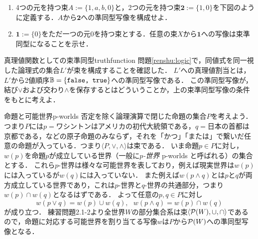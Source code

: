 \documentclass[11pt,a4paper, dvipdfmx]{jsarticle}
\begin{document}
\begin{renshu}{}{}
\begin{enumerate}
    \item 4つの元を持つ束$A := \{1, a, b, 0\}$と，2つの元を持つ束$\mathbf{2} := \{1, 0\}$を下図のように定義する．$A$から$\mathbf{2}$への準同型写像を構成せよ．\vspace{1em}
    \begin{center}
    \end{center}
    \item $\mathbf{1} := \{0\}$をただ一つの元$0$を持つ束とする．任意の束$X$から$\mathbf{1}$への写像は束準同型になることを示せ．
\end{enumerate}    
\end{renshu}    


\begin{rei}{真理値関数としての束準同型}{truthfunction}
問題\ref{renshu:logic}で，同値式を同一視した論理式の集合$L'$が束を構成することを確認した．
$L'$への真理値割当とは，$L'$から2値順序$\mathbb{B} = \{ \texttt{false, true} \}$への準同型写像である．
この準同型写像が，結び$\vee$および交わり$\wedge$を保存するとはどういうことか，上の束準同型写像の条件をもとに考えよ．
\end{rei}

\begin{rei}{命題と可能世界}{p-worlds}
否定を除く論理演算で閉じた命題の集合$P$を考えよう．
つまり$P$には$p=$ワシントンはアメリカの初代大統領である，$q=$日本の首都は京都である，などの原子命題のみならず，それを「かつ」「または」で繋いだ任意の命題が入っている．つまり$\langle P, \vee, \wedge \rangle$は束である．
いま命題$p \in P$に対し，$w(p)$を命題$p$が成立している世界（一般に\emph{$p$-世界} p-worlds と呼ばれる）の集合とする．
これら$p$-世界は様々な可能世界を表しており，例えば現実世界は$w(p)$には入っているが$w(q)$には入っていない．
また例えば$w(p \wedge q)$とは$p$と$q$が両方成立している世界であり，これは$p$-世界と$q$-世界の共通部分，つまり$w(p) \cap w(q)$となるはずである．
よって任意の$p, q \in P$に対し
\[ w(p \vee q) = w(p) \cup w(q), \ \ \ w(p \wedge q) = w(p) \cap w(q) \]
が成り立つ．
練習問題2.1-2より全世界$W$の部分集合系は束$\langle \mathcal{P}(W), \cup, \cap \rangle$であるので，命題に対応する可能世界を割り当てる写像$w$は$P$から$\mathcal{P}(W)$への準同型写像となる．
\end{rei}
\end{document}
